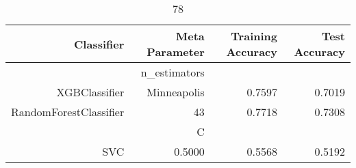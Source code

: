 
\begin{table}[H]
    \caption{78}
    \centering
    \begin{tabular}{|r|r|r|r|}
        \hline
        Classifier &Meta Parameter &Training Accuracy
        &Test Accuracy\\
        \hline
        &n\_estimators &\multicolumn{2}{|r|}{}\\
        \hline
        XGBClassifier &Minneapolis &0.7597 &0.7019\\
        \hline
        RandomForestClassifier &43 &0.7718 &0.7308\\
        \hline
        &C &\multicolumn{2}{|r|}{}\\
        \hline
        SVC &0.5000 &0.5568 &0.5192\\
        \hline
    \end{tabular}
\end{table}
